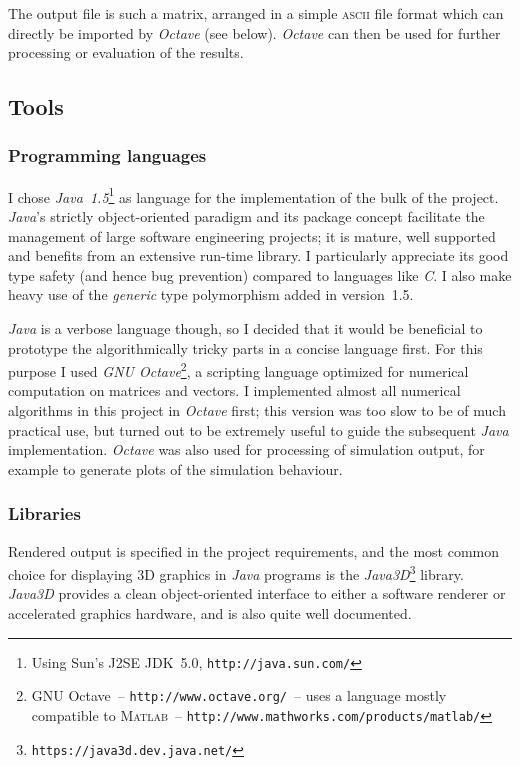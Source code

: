 The output file is such a matrix, arranged in a simple \textsc{ascii} file format which can
directly be imported by \textsl{Octave} (see below). \textsl{Octave} can then be used for further
processing or evaluation of the results.

\subsection{Tools\label{softwareTools}}
\subsubsection{Programming languages}
I chose \textsl{Java~1.5}\footnote{Using Sun's J2SE JDK~5.0, \texttt{http://java.sun.com/}}
as language for the implementation of the bulk of the project. \textsl{Java}'s strictly
object-oriented paradigm and its package concept facilitate the management of large software
engineering projects; it is mature, well supported and benefits from an extensive run-time library.
I particularly appreciate its good type safety (and hence bug prevention) compared to languages
like \textsl{C}. I also make heavy use of the \emph{generic} type polymorphism added in
version~1.5.

\textsl{Java} is a verbose language though, so I decided that it would be beneficial to prototype
the algorithmically tricky parts in a concise language first. For this purpose I used
\textsl{GNU Octave}\footnote{GNU Octave~-- \texttt{http://www.octave.org/}~-- uses a language
mostly compatible to \textsc{Matlab}~-- \texttt{http://www.mathworks.com/products/matlab/}},
a scripting language optimized for numerical computation on matrices and vectors. I implemented
almost all numerical algorithms in this project in \textsl{Octave} first; this version was too
slow to be of much practical use, but turned out to be extremely useful to guide the subsequent
\textsl{Java} implementation. \textsl{Octave} was also used for processing of simulation output,
for example to generate plots of the simulation behaviour.

\subsubsection{Libraries}
Rendered output is specified in the project requirements, and the most common choice for
displaying 3D graphics in \textsl{Java} programs is the
\textsl{Java3D}\footnote{\texttt{https://java3d.dev.java.net/}} library. \textsl{Java3D} provides
a clean object-oriented interface to either a software renderer or accelerated graphics hardware,
and is also quite well documented.

